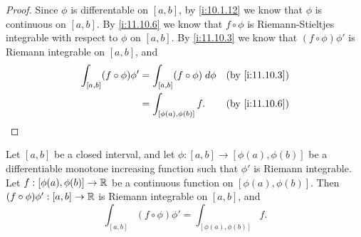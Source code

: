 \begin{proof}
  Since \(\phi\) is differentable on \([a, b]\), by \cref{i:10.1.12} we know that \(\phi\) is continuous on \([a, b]\).
  By \cref{i:11.10.6} we know that \(f \circ \phi\) is Riemann-Stieltjes integrable with respect to \(\phi\) on \([a, b]\).
  By \cref{i:11.10.3} we know that \((f \circ \phi) \phi'\) is Riemann integrable on \([a, b]\), and
  \begin{align*}
    \int_{[a, b]} (f \circ \phi) \phi' & = \int_{[a, b]} (f \circ \phi) \; d \phi &  & \by{i:11.10.3} \\
                                       & = \int_{[\phi(a), \phi(b)]} f.           &  & \by{i:11.10.6}
  \end{align*}
\end{proof}

\begin{ac}\label{i:ac:11.10.1}
  Let \([a, b]\) be a closed interval, and let \(\phi : [a, b] \to [\phi(a), \phi(b)]\) be a differentiable monotone increasing function such that \(\phi'\) is Riemann integrable.
  Let \(f : [\phi(a), \phi(b)] \to \mathbb{R}\) be a continuous function on \([\phi(a), \phi(b)]\).
  Then \((f \circ \phi) \phi' : [a, b] \to \mathbb{R}\) is Riemann integrable on \([a, b]\), and
  \[
    \int_{[a, b]} (f \circ \phi) \phi' = \int_{[\phi(a), \phi(b)]} f.
  \]
\end{ac}

